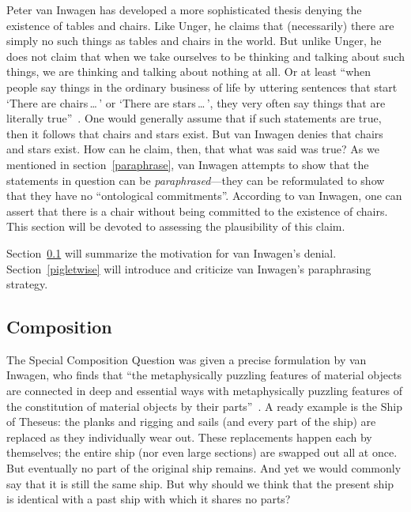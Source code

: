 \documentclass[11pt]{article}
\begin{document}
\begin{spacing}{1.5}
Peter van Inwagen has developed a more sophisticated thesis denying the existence of tables and chairs. Like Unger, he claims that (necessarily) there are simply no such things as tables and chairs in the world. But unlike Unger, he does not claim that when we take ourselves to be thinking and talking about such things, we are thinking and talking about nothing at all. Or at least ``when people say things in the ordinary business of life by uttering sentences that start `There are chairs\,\ldots\,' or `There are stars\,\ldots\,', they very often say things that are literally true''~\citep[102]{inwagen1995}. One would generally assume that if such statements are true, then it follows that chairs and stars exist. But van Inwagen denies that chairs and stars exist. How can he claim, then, that what was said was true? As we mentioned in section~\ref{paraphrase}, van Inwagen attempts to show that the statements in question can be {\em paraphrased}---they can be reformulated to show that they have no ``ontological commitments''. According to van Inwagen, one can assert that there is a chair without being committed to the existence of chairs. This section will be devoted to assessing the plausibility of this claim.

Section~\ref{comp} will summarize the motivation for van Inwagen's denial. Section~\ref{pigletwise} will introduce and criticize van Inwagen's paraphrasing strategy.

\subsection{Composition}
\label{comp}
The Special Composition Question was given a precise formulation by van Inwagen, who finds that ``the metaphysically puzzling features of material objects are connected in deep and essential ways with metaphysically puzzling features of the constitution of material objects by their parts''~\citep[18]{inwagen1995}. A ready example is the Ship of Theseus: the planks and rigging and sails (and every part of the ship) are replaced as they individually wear out. These replacements happen each by themselves; the entire ship (nor even large sections) are swapped out all at once. But eventually no part of the original ship remains. And yet we would commonly say that it is still the same ship. But why should we think that the present ship is identical with a past ship with which it shares no parts?


\end{spacing}
\end{document}
